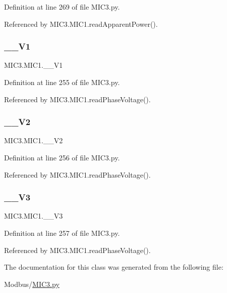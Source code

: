 Definition at line 269 of file M\+I\+C3.\+py.



Referenced by M\+I\+C3.\+M\+I\+C1.\+read\+Apparent\+Power().

\mbox{\label{class_m_i_c3_1_1_m_i_c1_a808ae0455f68a6e35d5cf646f2ed5bed}} 
\subsubsection{\texorpdfstring{\+\_\+\+\_\+\+V1}{\_\_V1}}
{\footnotesize\ttfamily M\+I\+C3.\+M\+I\+C1.\+\_\+\+\_\+\+V1\hspace{0.3cm}{\ttfamily [private]}}



Definition at line 255 of file M\+I\+C3.\+py.



Referenced by M\+I\+C3.\+M\+I\+C1.\+read\+Phase\+Voltage().

\mbox{\label{class_m_i_c3_1_1_m_i_c1_aa931212b1077630e0d00a7521b9ba7ef}} 
\subsubsection{\texorpdfstring{\+\_\+\+\_\+\+V2}{\_\_V2}}
{\footnotesize\ttfamily M\+I\+C3.\+M\+I\+C1.\+\_\+\+\_\+\+V2\hspace{0.3cm}{\ttfamily [private]}}



Definition at line 256 of file M\+I\+C3.\+py.



Referenced by M\+I\+C3.\+M\+I\+C1.\+read\+Phase\+Voltage().

\mbox{\label{class_m_i_c3_1_1_m_i_c1_ac14c988b04364214b6846226e31d7416}} 
\subsubsection{\texorpdfstring{\+\_\+\+\_\+\+V3}{\_\_V3}}
{\footnotesize\ttfamily M\+I\+C3.\+M\+I\+C1.\+\_\+\+\_\+\+V3\hspace{0.3cm}{\ttfamily [private]}}



Definition at line 257 of file M\+I\+C3.\+py.



Referenced by M\+I\+C3.\+M\+I\+C1.\+read\+Phase\+Voltage().



The documentation for this class was generated from the following file\+:\begin{DoxyCompactItemize}
\item 
Modbus/\hyperlink{_m_i_c3_8py}{M\+I\+C3.\+py}\end{DoxyCompactItemize}
